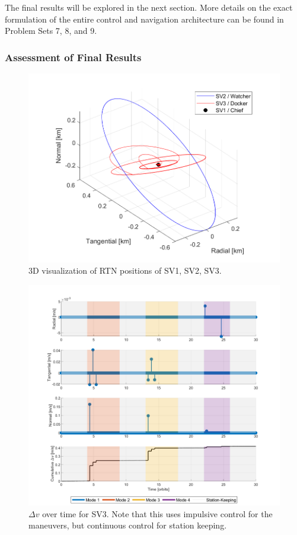 The final results will be explored in the next section. More details on the exact formulation of the entire control and navigation architecture can be found in Problem Sets 7, 8, and 9. 

\subsubsection{Assessment of Final Results}


\begin{figure}[H]
    \centering
    \includegraphics[width=0.75\linewidth]{sim/figures/PS9/ROE_3d_all_maneuvers.png}
    \caption{3D visualization of RTN positions of SV1, SV2, SV3.}
    \label{fig:3d_vis_final_summary}
\end{figure}

\begin{figure}[H]
    \centering
    \includegraphics[width=0.7\linewidth]{sim/figures/PS9/delta_v_cumulative_timeline_modes_SV3.png}
    \caption{$\Delta v$ over time for SV3. Note that this uses impulsive control for the maneuvers, but continuous control for station keeping.}
    \label{fig:delta_v_cumulative_sv3_final_sumary}
\end{figure}

